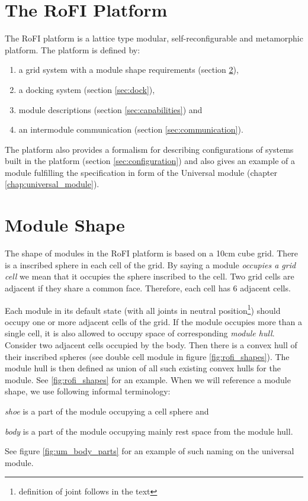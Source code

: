 \section{The RoFI Platform}

The RoFI platform is a lattice type modular, self-reconfigurable and metamorphic
platform. The platform is defined by:
\begin{enumerate}
    \item a grid system with a module shape requirements (section \ref{sec:aware}),
    \item a docking system (section \ref{sec:dock}),
    \item module descriptions (section \ref{sec:capabilities}) and
    \item an intermodule communication (section \ref{sec:communication}).
\end{enumerate}

The platform also provides a formalism for describing configurations of systems
built in the platform (section \ref{sec:configuration}) and also gives an
example of a module fulfilling the specification in form of the Universal
module (chapter \ref{chap:universal_module}).

\section{Module Shape}\label{sec:aware}

The shape of modules in the RoFI platform is based on a 10cm cube grid. There is
a inscribed sphere in each cell of the grid. By saying a module \emph{occupies a
grid cell} we mean that it occupies the sphere inscribed to the cell. Two grid
cells are adjacent if they share a common face. Therefore, each cell has 6
adjacent cells.

Each module in its default state (with all joints in neutral
position\footnote{definition of joint follows in the text}) should occupy one or
more adjacent cells of the grid. If the module occupies more than a single cell,
it is also allowed to occupy space of corresponding \emph{module hull}. Consider
two adjacent cells occupied by the body. Then there is a convex hull of their
inscribed spheres (see double cell module in figure \ref{fig:rofi_shapes}). The
module hull is then defined as union of all such existing convex hulls for the
module. See \ref{fig:rofi_shapes} for an example. When we will reference a
module shape, we use following informal terminology:
\begin{enumerate*}
    \item \emph{shoe} is a part of the module occupying a cell sphere and
    \item \emph{body} is a part of the module occupying mainly rest space from
    the module hull.
\end{enumerate*}
See figure \ref{fig:um_body_parts} for an example of such naming on the
universal module.


